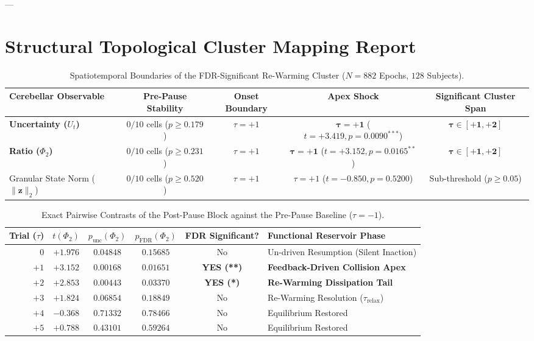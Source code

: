 \documentclass[11pt,twoside,a4paper]{article}
\begin{document}
---

\section{Structural Topological Cluster Mapping Report}

\begin{table}[H]
\centering
\caption{Spatiotemporal Boundaries of the FDR-Significant Re-Warming Cluster ($N=882$ Epochs, $128$ Subjects).}
\label{tab:cluster_report}
\vspace{0.4em}
\small
\begin{tabular}{l c c c c}
\toprule
\textbf{Cerebellar Observable} & \textbf{Pre-Pause Stability} & \textbf{Onset Boundary} & \textbf{Apex Shock} & \textbf{Significant Cluster Span} \\
\midrule
\textbf{Uncertainty ($U_t$)} & $0/10$ cells ($p \ge 0.179$) & $\tau = +1$ & $\mathbf{\tau = +1}$ ($t = +3.419, p = 0.0090^{***}$) & $\mathbf{\tau \in [+1, +2]}$ \\
\textbf{Ratio ($\Phi_2$)} & $0/10$ cells ($p \ge 0.231$) & $\tau = +1$ & $\mathbf{\tau = +1}$ ($t = +3.152, p = 0.0165^{**}$) & $\mathbf{\tau \in [+1, +2]}$ \\
Granular State Norm ($\|\mathbf{z}\|_2$) & $0/10$ cells ($p \ge 0.520$) & $\tau = +1$ & $\tau = +1$ ($t = -0.850, p = 0.5200$) & Sub-threshold ($p \ge 0.05$) \\
\bottomrule
\end{tabular}
\end{table}

\begin{table}[H]
\centering
\caption{Exact Pairwise Contrasts of the Post-Pause Block against the Pre-Pause Baseline ($\tau = -1$).}
\label{tab:post_pause_contrasts}
\vspace{0.4em}
\small
\begin{tabular}{r c c c c l}
\toprule
\textbf{Trial ($\tau$)} & \textbf{$t(\Phi_2)$} & \textbf{$p_{\text{unc}}(\Phi_2)$} & \textbf{$p_{\text{FDR}}(\Phi_2)$} & \textbf{FDR Significant?} & \textbf{Functional Reservoir Phase} \\
\midrule
$0$ & $+1.976$ & $0.04848$ & $0.15685$ & No & Un-driven Resumption (Silent Inaction) \\
\textbf{$+1$} & $\mathbf{+3.152}$ & $\mathbf{0.00168}$ & $\mathbf{0.01651}$ & \textbf{YES (**)} & \textbf{Feedback-Driven Collision Apex} \\
\textbf{$+2$} & $\mathbf{+2.853}$ & $\mathbf{0.00443}$ & $\mathbf{0.03370}$ & \textbf{YES (*)} & \textbf{Re-Warming Dissipation Tail} \\
$+3$ & $+1.824$ & $0.06854$ & $0.18849$ & No & Re-Warming Resolution ($\tau_{\text{relax}}$) \\
$+4$ & $-0.368$ & $0.71332$ & $0.78466$ & No & Equilibrium Restored \\
$+5$ & $+0.788$ & $0.43101$ & $0.59264$ & No & Equilibrium Restored \\
\bottomrule
\end{tabular}
\end{table}
\end{document}
